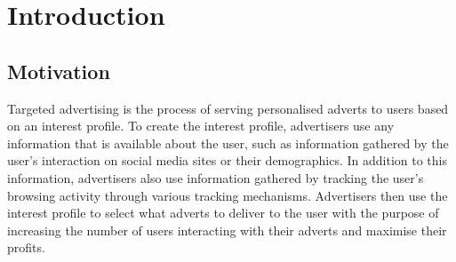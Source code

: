 \documentclass{l4proj}
\begin{document}
%
%
%
%
%
%
%
%
\chapter{Introduction}


\section{Motivation}
Targeted advertising is the process of serving personalised adverts to users based on an interest profile. To create the interest profile, advertisers use any information that is available about the user, such as information gathered by the user's interaction on social media sites or their demographics. In addition to this information, advertisers also use information gathered by tracking the user’s
browsing activity through various tracking mechanisms. Advertisers then use the interest profile to select what adverts to deliver to the user with the purpose of increasing the number of users interacting with their adverts and maximise their profits. 
\end{document}
